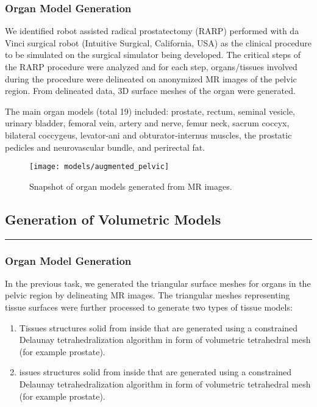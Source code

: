 \subsubsection{Organ Model Generation}\label{sssec:generation_models}

We identified robot assisted radical prostatectomy (RARP) performed with da Vinci surgical robot (Intuitive Surgical, California, USA) as the clinical procedure to be simulated on the surgical simulator being developed. The critical steps of the RARP procedure were analyzed and for each step, organs/tissues involved during the procedure were delineated on anonymized MR images of the pelvic region. From delineated data, 3D surface meshes of the organ were generated.

The main organ models (total 19) included: prostate, rectum, seminal vesicle, urinary bladder, femoral vein, artery and nerve, femur neck, sacrum coccyx, bilateral coccygeus, levator-ani and obturator-internus muscles, the prostatic pedicles and neurovascular bundle, and perirectal fat.

\begin{figure}
  \centering%
  \texttt{[image: models/augmented\_pelvic]}
  \caption{Snapshot of organ models generated from MR images.}\label{fig:organ_generation}
\end{figure}

\subsection{Generation of Volumetric Models}\label{ssec:generation_volume}

\hrule%

\subsubsection{Organ Model Generation}\label{sssec:generation_models}

In the previous task, we generated the triangular surface meshes for organs in the pelvic region by delineating MR images.
The triangular meshes representing tissue surfaces were further processed to generate two types of tissue models:
\begin{enumerate}
  \item Tissues structures solid from inside that are generated using a constrained Delaunay tetrahedralization algorithm in form of volumetric tetrahedral mesh (for example prostate).
  \item issues structures solid from inside that are generated using a constrained Delaunay tetrahedralization algorithm in form of volumetric tetrahedral mesh (for example prostate).
\end{enumerate}

